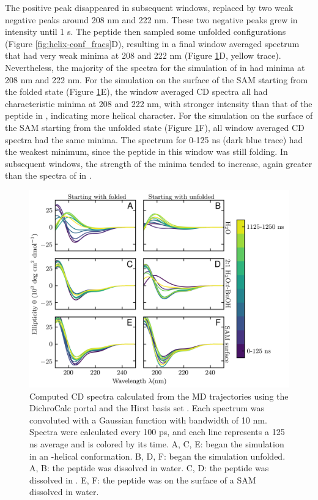 The positive peak disappeared in subsequent windows, replaced by two weak negative peaks around 208 nm and 222 nm. 
These two negative peaks grew in intensity until 1 \textmu{}s. 
The peptide then sampled some unfolded configurations (Figure \ref{fig:helix-conf_fracs}D), resulting in a final window averaged spectrum that had very weak minima at 208 and 222 nm (Figure \ref{fig:helix-calc_cd}D, yellow trace). 
Nevertheless, the majority of the spectra for the simulation of \pep{} in \tbawat{} had minima at 208 nm and 222 nm. 
For the simulation on the surface of the SAM starting from the folded state (Figure \ref{fig:helix-calc_cd}E), the window averaged CD spectra all had characteristic minima at 208 and 222 nm, with stronger intensity than that of the peptide in \tbawat{}, indicating more helical character. 
For the simulation on the surface of the SAM starting from the unfolded state (Figure \ref{fig:helix-calc_cd}F), all window averaged CD spectra had the same minima. 
The spectrum for 0-125 ns (dark blue trace) had the weakest minimum, since the peptide in this window was still folding. 
In subsequent windows, the strength of the minima tended to increase, again greater than the spectra of \pep{} in \tbawat{}.

\begin{figure}
    \center
    \includegraphics[width=\double]{figures-helix/cd_spectra_hirst_time_resolved.png}
    \caption{
        Computed CD spectra calculated from the MD trajectories using the DichroCalc portal and the Hirst basis set \cite{Hirst1998, Besley1999}.
        Each spectrum was convoluted with a Gaussian function with bandwidth of 10 nm. 
        Spectra were calculated every 100 ps, and each line represents a 125 ns average and is colored by its time. 
        A, C, E: \pep{} began the simulation in an \textalpha{}-helical conformation. 
        B, D, F: \pep{} began the simulation unfolded. 
        A, B: the peptide was dissolved in water. 
        C, D: the peptide was dissolved in \tbawat{}. 
        E, F: the peptide was on the surface of a SAM dissolved in water.
    }
    \label{fig:helix-calc_cd}
\end{figure}

